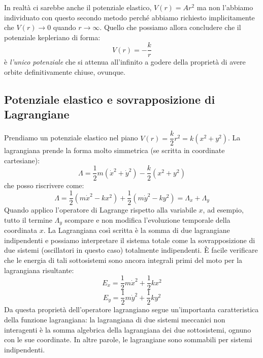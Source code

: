 \documentclass[a4paper,openany]{article}
\begin{document}
	In realtà ci sarebbe anche il potenziale elastico, $V(r) = Ar^2$ ma non l'abbiamo individuato con questo secondo metodo perché abbiamo richiesto implicitamente che $V(r)\to0$ quando $r\to\infty$. Quello che possiamo allora concludere che il potenziale kepleriano di forma:
	\begin{equation}\label{key}
		V(r) = -\dfrac{k}{r}
	\end{equation}
	è \textit{l'unico potenziale} che si attenua all'infinito a godere della proprietà di avere orbite definitivamente chiuse, ovunque.
	
	\subsection{Potenziale elastico e sovrapposizione di Lagrangiane}
	Prendiamo un potenziale elastico nel piano $V(r) = \dfrac{k}{2}r^{2} = k(x^{2}+y^{2})$. La lagrangiana prende la forma molto simmetrica (se scritta in coordinate cartesiane):
	\begin{equation}
		\Lambda = \dfrac{1}{2}m(\dot{x}^{2}+\dot{y}^{2}) - \dfrac{k}{2}(x^{2}+y^{2})
		\label{LagXY}
	\end{equation}
	che posso riscrivere come:
	$$
	\Lambda = \dfrac{1}{2}(m\dot{x}^{2}-kx^{2}) + \dfrac{1}{2}(m\dot{y}^{2}-ky^{2}) = \Lambda_{x} + \Lambda_{y}
	$$
	Quando applico l'operatore di Lagrange rispetto alla variabile $x$, ad esempio, tutto il termine $\Lambda_{y}$ scompare e non modifica l'evoluzione temporale della coordinata $x$. La Lagrangiana così scritta è la somma di due lagrangiane indipendenti e possiamo interpretare il sistema totale come la sovrapposizione di due sistemi (oscillatori in questo caso) totalmente indipendenti. È facile verificare che le energia di tali sottosistemi sono ancora integrali primi del moto per la lagrangiana risultante:
	$$
	E_{x} = \dfrac{1}{2}m\dot{x}^{2} + \dfrac{1}{2}kx^{2}
	$$
	$$
	E_{y} = \dfrac{1}{2}m\dot{y}^{2} + \dfrac{1}{2}ky^{2}
	$$
	Da questa proprietà dell'operatore lagrangiano segue un'importanta caratteristica della funzione lagrangiana: la lagrangiana di due sistemi meccanici non interagenti è la somma algebrica della lagrangiana dei due sottosistemi, ognuno con le sue coordinate. In altre parole, le lagrangiane sono sommabili per sistemi indipendenti.
	
\end{document}
